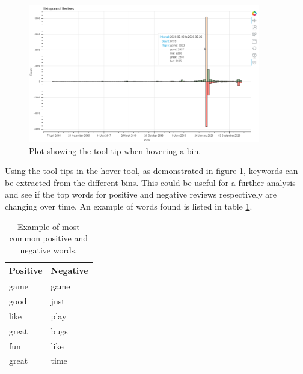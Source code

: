 \begin{figure}[h]
    \caption{Plot showing the tool tip when hovering a bin.}
    \label{fig:hover-tool}
    \centering
    \includegraphics[width=0.9\textwidth]{../plots/demo.png}
\end{figure}

Using the tool tips in the hover tool, as demonstrated in figure \ref{fig:hover-tool}, keywords can be extracted from the different bins. 
This could be useful for a further analysis and see if the top words for positive and negative reviews respectively are changing over time. 
An example of words found is listed in table \ref{tab:words}.


\begin{table}[H]
    \centering
    \caption{Example of most common positive and negative words.}
    \label{tab:words}
    \begin{tabular}{@{}ll@{}}
    \toprule
    Positive & Negative \\ \midrule
    game     & game     \\
    good     & just     \\
    like     & play     \\
    great    & bugs     \\
    fun      & like     \\
    great    & time     \\ \bottomrule
    \end{tabular}
\end{table}